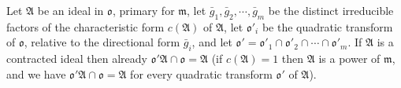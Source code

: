 Let $\mathfrak{A}$ be an ideal in $\mathfrak{o}$, primary for $\mathfrak{m}$, let $\bar{g}_1, \bar{g}_2, \cdots, \bar{g}_m$ be the distinct irreducible factors of the characteristic form $c(\mathfrak{A})$ of $\mathfrak{A}$, let $\mathfrak{o}'_i$ be the quadratic transform of $\mathfrak{o}$, relative to the directional form $\bar{g}_i$, and let $\mathfrak{o}' = \mathfrak{o}'_1 \cap \mathfrak{o}'_2 \cap \cdots \cap \mathfrak{o}'_m$. If $\mathfrak{A}$ is a contracted ideal then already $\mathfrak{o}'\mathfrak{A} \cap \mathfrak{o} = \mathfrak{A}$ (if $c(\mathfrak{A}) = 1$ then $\mathfrak{A}$ is a power of $\mathfrak{m}$, and we have $\mathfrak{o}'\mathfrak{A} \cap \mathfrak{o} = \mathfrak{A}$ for every quadratic transform $\mathfrak{o}'$ of $\mathfrak{A}$).